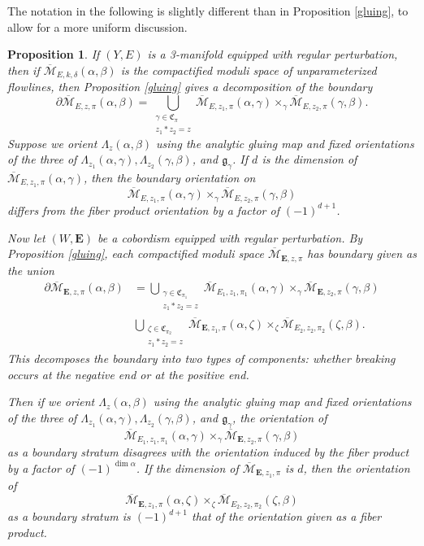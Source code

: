 \documentclass[10pt,a4paper]{amsart}
\newtheorem{proposition}[theorem]{Proposition}
\theoremstyle{definition}
\theoremstyle{remark}
\numberwithin{figure}{qchap}
\begin{document}
The notation in the following is slightly different than in Proposition \ref{gluing}, to allow for a more uniform discussion.

\begin{proposition}\label{boundary-orientation}If $(Y,E)$ is a 3-manifold equipped with regular perturbation, then if $\overline{\mathcal M}_{E,k,\delta}(\alpha, \beta)$ is the compactified moduli space of unparameterized flowlines, then Proposition \ref{gluing} gives a decomposition of the boundary $$\partial \overline{\mathcal M}_{E,z,\pi}(\alpha, \beta) = \bigcup_{\substack{\gamma \in \mathfrak C_\pi\\ z_1 \ast z_2 = z}} \overline{\mathcal M}_{E,z_1,\pi}(\alpha, \gamma) \times_\gamma \overline{\mathcal M}_{E,z_2,\pi}(\gamma, \beta).$$ Suppose we orient $\Lambda_z(\alpha, \beta)$ using the analytic gluing map and fixed orientations of the three of $\Lambda_{z_1}(\alpha, \gamma), \Lambda_{z_2}(\gamma, \beta)$, and $\mathfrak g_\gamma$. If $d$ is the dimension of $\overline{\mathcal M}_{E,z_1,\pi}(\alpha, \gamma)$, then the boundary orientation on $$\overline{\mathcal M}_{E,z_1,\pi}(\alpha, \gamma) \times_\gamma \overline{\mathcal M}_{E,z_2,\pi}(\gamma, \beta)$$ differs from the fiber product orientation by a factor of $(-1)^{d+1}$.

Now let $(W,\mathbf{E})$ be a cobordism equipped with regular perturbation. By Proposition \ref{gluing}, each compactified moduli space $\overline{\mathcal M}_{\mathbf{E},z,\pi}$ has boundary given as the union \begin{align*}\partial \overline{\mathcal M}_{\mathbf E,z,\pi}(\alpha, \beta) &= \bigcup_{\substack{\gamma \in \mathfrak C_{\pi_1}\\ z_1 \ast z_2 = z}} \overline{\mathcal M}_{E_1,z_1,\pi_1}(\alpha, \gamma) \times_\gamma \overline{\mathcal M}_{\mathbf{E},z_2,\pi}(\gamma, \beta)\\
&\bigcup_{\substack{\zeta \in \mathfrak C_{\pi_2}\\ z_1 \ast z_2 = z}} \overline{\mathcal M}_{\mathbf{E},z_1,\pi} (\alpha, \zeta) \times_\zeta \overline{\mathcal M}_{E_2,z_2,\pi_2}(\zeta, \beta).\end{align*} This decomposes the boundary into two types of components: whether breaking occurs at the negative end or at the positive end.

Then if we orient $\Lambda_z(\alpha, \beta)$ using the analytic gluing map and fixed orientations of the three of $\Lambda_{z_1}(\alpha, \gamma), \Lambda_{z_2}(\gamma, \beta)$, and $\mathfrak g_\gamma$, the orientation of $$\overline{\mathcal M}_{E_1,z_1,\pi_1}(\alpha, \gamma) \times_\gamma \overline{\mathcal M}_{\mathbf{E},z_2,\pi}(\gamma, \beta)$$ as a boundary stratum disagrees with the orientation induced by the fiber product by a factor of $(-1)^{\dim \alpha}$. If the dimension of $\overline{\mathcal M}_{\mathbf{E},z_1,\pi}$ is $d$, then the orientation of $$\overline{\mathcal M}_{\mathbf{E},z_1,\pi} (\alpha, \zeta) \times_\zeta \overline{\mathcal M}_{E_2,z_2,\pi_2}(\zeta, \beta)$$ as a boundary stratum is $(-1)^{d+1}$ that of the orientation given as a fiber product.
\end{proposition}
\end{document}
